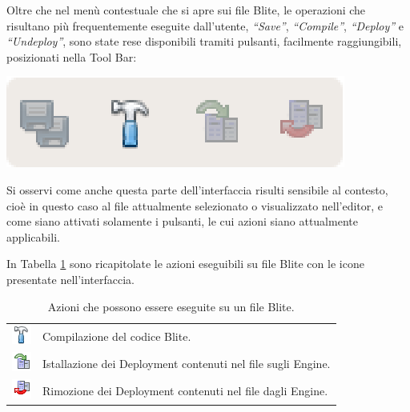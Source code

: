 Oltre che nel menù contestuale che si apre sui file Blite, le operazioni che
risultano più frequentemente eseguite dall'utente, \emph{``Save''},
\emph{``Compile''}, \emph{``Deploy''} e \emph{``Undeploy''}, sono state rese
disponibili tramiti pulsanti, facilmente raggiungibili, posizionati nella Tool
Bar:

\begin{center}
\includegraphics[scale=0.70]
{blide/dia/BlideFileToolBar}
\end{center}

Si osservi come anche questa parte dell'interfaccia risulti sensibile al
contesto, cioè in questo caso al file attualmente selezionato o visualizzato
nell'editor, e come siano attivati solamente i pulsanti, le cui azioni siano
attualmente applicabili. 

In Tabella \ref{tab:blideactions} sono ricapitolate le azioni eseguibili su file Blite con le
icone presentate nell'interfaccia.

\begin{table}
\begin{center}
\begin{tabular}{c p{} }
\includegraphics[scale=0.8]{blide/dia/build24} & Compilazione del codice
Blite.\\ 
\includegraphics[scale=0.8]{blide/dia/deploy24} & Istallazione dei Deployment
contenuti nel file sugli Engine.\\
\includegraphics[scale=0.8]{blide/dia/undeploy24} & Rimozione dei Deployment
contenuti nel file dagli Engine.
\end{tabular}

\caption{Azioni che possono essere eseguite su un file Blite.}
\label{tab:blideactions}
\end{center}
\end{table}


